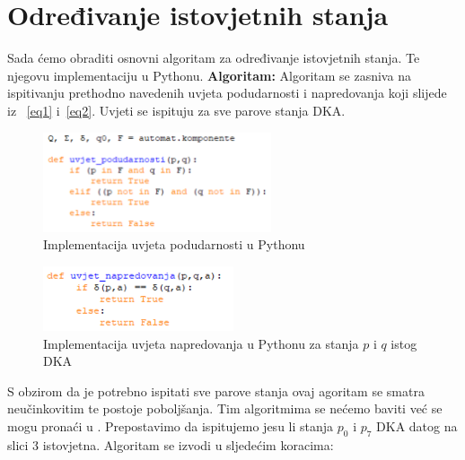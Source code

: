 \documentclass[titlepage]{article}
\begin{document}
\section{Određivanje istovjetnih stanja}
Sada ćemo obraditi osnovni algoritam za određivanje istovjetnih stanja. Te njegovu implementaciju u Pythonu. 
\newline
\textbf{Algoritam:} Algoritam se zasniva na ispitivanju prethodno navedenih uvjeta podudarnosti i napredovanja koji slijede iz ~\eqref{eq1} i~\eqref{eq2}. Uvjeti se ispituju za sve parove stanja DKA. 
\begin{figure}[h]
\centering
\includegraphics[width=0.6\textwidth]{uvjeti_1.png}
\caption{Implementacija uvjeta podudarnosti u Pythonu}
\end{figure}
\begin{figure}[h]
\centering
\includegraphics[width=0.5\textwidth]{uvjeti_2.png}
\caption{Implementacija uvjeta napredovanja u Pythonu za stanja $p$ i $q$ istog DKA}
\end{figure}
\newline
S obzirom da  je potrebno ispitati sve parove stanja ovaj agoritam se smatra neučinkovitim te postoje poboljšanja. Tim algoritmima se nećemo baviti već se mogu pronaći u \cite{c1}.
\newline
Prepostavimo da ispitujemo jesu li stanja $p_0$ i $p_7$ DKA datog na slici 3 istovjetna. 
Algoritam se izvodi u sljedećim koracima: 
\end{document}

